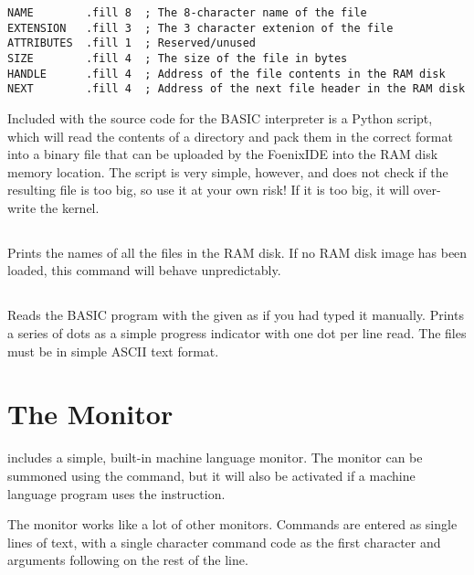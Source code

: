 \documentclass{report}
\begin{document}
    \begin{verbatim}
NAME        .fill 8  ; The 8-character name of the file
EXTENSION   .fill 3  ; The 3 character extenion of the file
ATTRIBUTES  .fill 1  ; Reserved/unused
SIZE        .fill 4  ; The size of the file in bytes
HANDLE      .fill 4  ; Address of the file contents in the RAM disk
NEXT        .fill 4  ; Address of the next file header in the RAM disk
    \end{verbatim}

    Included with the source code for the BASIC interpreter is a Python script,  which
    will read the contents of a directory and pack them in the correct format into a binary file that
    can be uploaded by the FoenixIDE into the RAM disk memory location.
    The script is very simple, however, and does not check if the resulting file is too big, so
    use it at your own risk! If it is too big, it will over-write the kernel.

    \subsection*{}

    Prints the names of all the files in the RAM disk.
    If no RAM disk image has been loaded, this command will behave unpredictably.

    \subsection*{ }

    Reads the BASIC program with the given  as if you had typed it manually.
    Prints a series of dots as a simple progress indicator with one dot per line read.
    The files must be in simple ASCII text format.

    \section*{The Monitor}

    \BASIC includes a simple, built-in machine language monitor.
    The monitor can be summoned using the  command, but it will also be
    activated if a machine language program uses the  instruction.

    The monitor works like a lot of other monitors.
    Commands are entered as single lines of text, with a single character command code
    as the first character and arguments following on the rest of the line.
\end{document}
